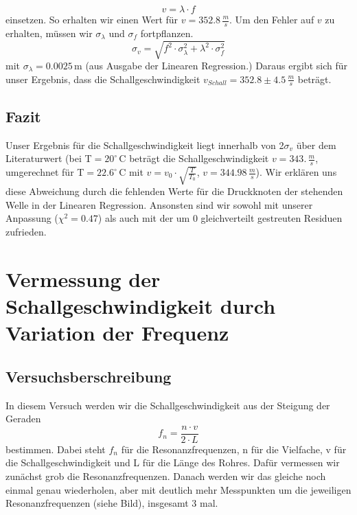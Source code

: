 \documentclass[12pt,a4paper]{article}
\begin{document}
\begin{equation*}
v = \lambda\cdot f
\end{equation*}
einsetzen. So erhalten wir einen Wert für $v = 352.8\,\frac{m}{s}$.
Um den Fehler auf $v$ zu erhalten, müssen wir $\sigma_{\lambda}$ und $\sigma_f$ fortpflanzen.
\begin{equation}
\sigma_{v} = \sqrt{f^2\cdot\sigma_{\lambda}^2 + \lambda^2\cdot\sigma_{f}^2}
\end{equation}
mit $\sigma_{\lambda} = 0.0025\,$m (aus Ausgabe der Linearen Regression.)
Daraus ergibt sich für unser Ergebnis, dass die Schallgeschwindigkeit $v_{Schall} = 352.8 \pm 4.5\,\frac{m}{s}$ beträgt.

\subsection{Fazit}
Unser Ergebnis für die Schallgeschwindigkeit liegt innerhalb von 2$\sigma_{v}$ über dem Literaturwert (bei T$ = 20^{\circ}\,$C beträgt die Schallgeschwindigkeit $v = 343.\,\frac{m}{s}$, umgerechnet für T$ = 22.6^{\circ}\,$C mit $v = v_0\cdot\sqrt{\frac{T}{T_0}}$, $v = 344.98\,\frac{m}{s}$). Wir erklären uns diese Abweichung durch die fehlenden Werte für die Druckknoten der stehenden Welle in der Linearen Regression. Ansonsten sind wir sowohl mit unserer Anpassung ($\chi^2 = 0.47$) als auch mit der um 0 gleichverteilt gestreuten Residuen zufrieden.
\section{Vermessung der Schallgeschwindigkeit durch Variation der Frequenz}
\subsection{Versuchsberschreibung}
In diesem Versuch werden wir die Schallgeschwindigkeit aus der Steigung der Geraden 
\begin{equation}
f_n = \frac{n\cdot v}{2\cdot L}
\end{equation}
bestimmen. Dabei steht $f_n$ für die Resonanzfrequenzen, n für die Vielfache, v für die Schallgeschwindigkeit und L für die Länge des Rohres. Dafür vermessen wir zunächst grob die Resonanzfrequenzen.
Danach werden wir das gleiche noch einmal genau wiederholen, aber mit deutlich mehr Messpunkten um die jeweiligen Resonanzfrequenzen (siehe Bild), insgesamt 3 mal.
\end{document}
